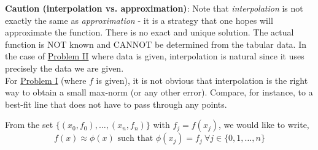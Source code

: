 \begin{tcolorbox}[
		colback = red!5,
		colframe = red!75
	]
	\textbf{Caution (interpolation vs. approximation)}: Note that \textit{interpolation} is not exactly the same as \textit{approximation} - it is a strategy that one hopes will approximate the function. There is no exact and unique solution. The actual function is NOT known and CANNOT be determined from the tabular data. In the case of \hyperlink{mar4:int_prob:2}{Problem II} where data is given, interpolation is natural since it uses precisely
	the data we are given.\\
	For \hyperlink{mar4:int_prob:1}{Problem I} (where $f$ is given), it is not obvious that interpolation is the right way to obtain a small max-norm (or any other error). Compare, for instance, to a best-fit line that does not have to pass through any points.
\end{tcolorbox}

From the set $\{ (x_0, f_0), \ldots ,(x_n, f_n) \}$ with $f_j = f(x_j)$, we would like to write,
\[
	f(x) \approx \phi(x) \text{ such that } \phi(x_j) = f_j \ \forall j \in \{0,1, \ldots , n\}
\]

